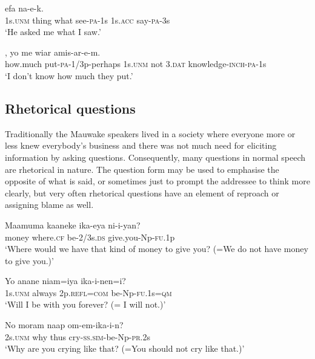 \ea%
\label{ex:7:x1203}
  efa  na-e-k. \\
1s.\textsc{unm}  thing  what  see-\textsc{pa}-1s  1s.\textsc{acc}  say-\textsc{pa}-3s      \\
\glt `He asked me what I saw.'
\z





\ea%
\label{ex:7:x1204}
,  yo  me  wiar amis-ar-e-m. \\
how.much  put-\textsc{pa}-1/3p-perhaps  1s.\textsc{unm}  not  3.\textsc{dat} knowledge-\textsc{inch}-\textsc{pa}-1s     \\
\glt `I don't know how much they put.'
\z




\subsection{Rhetorical questions}
{}
Traditionally the Mauwake speakers lived in a society where everyone more or less knew everybody's business and there was not much need for eliciting information by asking questions. Consequently, many questions in normal speech are rhetorical in nature. The question form may be used to emphasise the opposite of what is said, or sometimes just to prompt the addressee to think more clearly, but very often rhetorical questions have an element of reproach or assigning blame as well.

\ea%
\label{ex:7:x1205}
\gll Maamuma  kaaneke  ika-eya  ni-i-yan? \\
 money  where.\textsc{cf}  be-2/3s.\textsc{ds}  give.you-Np-\textsc{fu}.1p     \\
\glt `Where would we have that kind of money to give you? (=We do not have money to give you.)'
\z





\ea%
\label{ex:7:x1206}
\gll Yo  anane  niam=iya  ika-i-nen=i? \\
1s.\textsc{unm}  always  2p.\textsc{refl}=\textsc{com}  be-Np-\textsc{fu}.1s=\textsc{qm}      \\
\glt `Will I be with you forever? (= I will not.)'
\z





\ea%
\label{ex:7:x1202}
\gll No  moram  naap  om-em-ika-i-n? \\
2s.\textsc{unm}  why  thus  cry-\textsc{ss}.\textsc{sim}-be-Np-\textsc{pr}.2s      \\
\glt `Why are you crying like that? (=You should not cry like that.)'
\z





